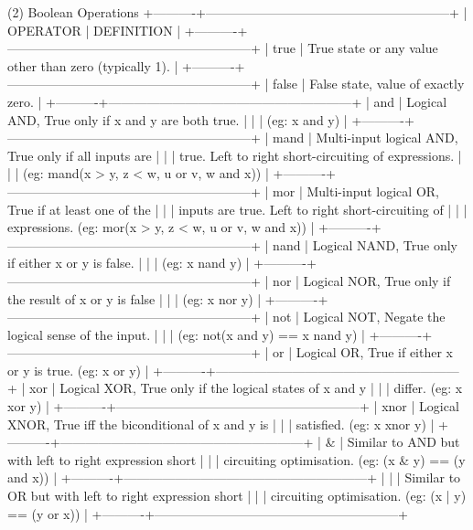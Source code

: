 (2) Boolean Operations
+----------+---------------------------------------------------------+
| OPERATOR | DEFINITION                                              |
+----------+---------------------------------------------------------+
| true     | True state or any value other than zero (typically 1).  |
+----------+---------------------------------------------------------+
| false    | False state, value of exactly zero.                     |
+----------+---------------------------------------------------------+
| and      | Logical AND, True only if x and y are both true.        |
|          | (eg: x and y)                                           |
+----------+---------------------------------------------------------+
| mand     | Multi-input logical AND, True only if all inputs are    |
|          | true. Left to right short-circuiting of expressions.    |
|          | (eg: mand(x > y, z < w, u or v, w and x))               |
+----------+---------------------------------------------------------+
| mor      | Multi-input logical OR, True if at least one of the     |
|          | inputs are true. Left to right short-circuiting of      |
|          | expressions.  (eg: mor(x > y, z < w, u or v, w and x))  |
+----------+---------------------------------------------------------+
| nand     | Logical NAND, True only if either x or y is false.      |
|          | (eg: x nand y)                                          |
+----------+---------------------------------------------------------+
| nor      | Logical NOR, True only if the result of x or y is false |
|          | (eg: x nor y)                                           |
+----------+---------------------------------------------------------+
| not      | Logical NOT, Negate the logical sense of the input.     |
|          | (eg: not(x and y) == x nand y)                          |
+----------+---------------------------------------------------------+
| or       | Logical OR, True if either x or y is true. (eg: x or y) |
+----------+---------------------------------------------------------+
| xor      | Logical XOR, True only if the logical states of x and y |
|          | differ.  (eg: x xor y)                                  |
+----------+---------------------------------------------------------+
| xnor     | Logical XNOR, True iff the biconditional of x and y is  |
|          | satisfied.  (eg: x xnor y)                              |
+----------+---------------------------------------------------------+
| \&        | Similar to AND but with left to right expression short  |
|          | circuiting optimisation.  (eg: (x \& y) == (y and x))    |
+----------+---------------------------------------------------------+
| |        | Similar to OR but with left to right expression short   |
|          | circuiting optimisation.  (eg: (x | y) == (y or x))     |
+----------+---------------------------------------------------------+

